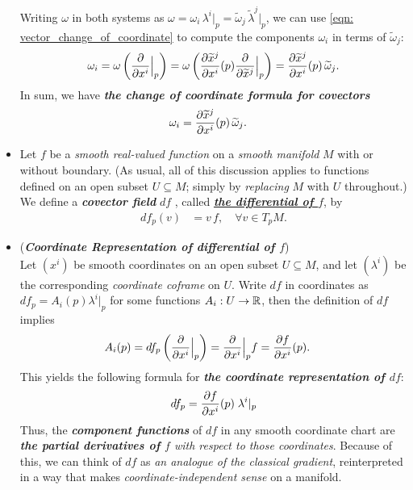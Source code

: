 \documentclass[11pt]{article}
\begin{document}
\begin{itemize}
\begin{remark}
Writing $\omega$ in both systems as $\omega = \omega_{i}\,\lambda^i\big|_{p} =  \widetilde{\omega}_{j}\,\widetilde{\lambda}^j\big|_{p} $, we can use \eqref{eqn: vector_change_of_coordinate} to compute the components $\omega_i$ in terms of $\widetilde{\omega}_{j}$:
\begin{align*}
\omega_{i} = \omega\left(\frac{\partial }{ \partial x^{i}}\Bigr|_{p}\right) = \omega\left(\frac{\partial \widetilde{x}^{j}}{ \partial x^{i}}(p)\frac{\partial }{ \partial \widetilde{x}^{j}}\Bigr|_{p}\right)= \frac{\partial \widetilde{x}^{j}}{ \partial x^{i}}(p)\,\widetilde{\omega}_{j}.
\end{align*}
In sum, we have \emph{\textbf{the change of coordinate formula for covectors}}
\begin{align}
\omega_{i} &= \frac{\partial \widetilde{x}^{j}}{ \partial x^{i}}(p)\,\widetilde{\omega}_{j}. \label{eqn: covector_change_of_coordinate}
\end{align}
\end{remark}

\item  \begin{definition}
Let $f$ be a \emph{smooth real-valued function} on a \emph{smooth manifold} $M$ with or without boundary. (As usual, all of this discussion applies to functions defined on an open subset $U \subseteq M$; simply by \emph{replacing} $M$ with $U$ throughout.) We define a \emph{\textbf{covector field}} $df$ , called \underline{\emph{\textbf{the differential of $f$}}}, by
\begin{align*}
df_{p}(v) &= v\,f, \quad \forall v\in T_{p}M.
\end{align*}
\end{definition}


\item \begin{remark} (\emph{\textbf{Coordinate Representation of differential of $f$}})\\
Let $(x^i)$ be smooth coordinates on an open subset $U \subseteq M$, and let $(\lambda^i)$ be the corresponding \emph{coordinate coframe} on $U$. Write $df$ in coordinates as $df_p = A_i(p) \lambda^i |_p$ for some functions $A_i: U \rightarrow {\mathbb R}$,  then the definition of $df$ implies
\begin{align*}
A_i(p) &= df_{p}\left(\frac{\partial }{ \partial x^{i}}\Bigr|_{p}\right) = \frac{\partial }{ \partial x^{i}}\Bigr|_{p} f = \frac{\partial f}{ \partial x^{i}}(p).
\end{align*} This yields the following formula for \emph{\textbf{the coordinate representation of $df$}}:
\begin{align}
df_p = \frac{\partial f}{ \partial x^{i}}(p) \; \lambda^i |_p \label{eqn: differential_coordinate_representation_0}
\end{align} Thus, the \emph{\textbf{component functions}} of $df$ in any smooth coordinate chart are \emph{\textbf{the partial derivatives of $f$} with respect to those coordinates}. Because of this, we can think of $df$ as \emph{an analogue of the classical gradient}, reinterpreted in a way that makes \emph{coordinate-independent sense} on a manifold.
\end{remark}


\end{itemize}
\end{document}
